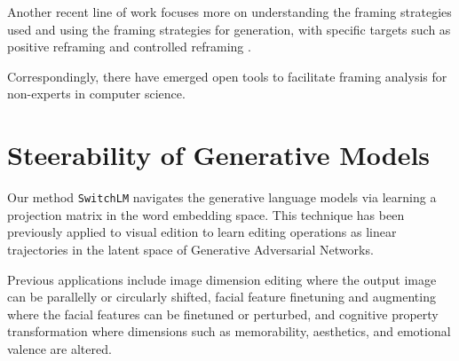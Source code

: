 Another recent line of work focuses more on understanding the framing strategies used \cite{field-etal-2018-framing,ziems-yang-2021-protect-serve} and using the framing strategies for generation, with specific targets such as positive reframing \cite{ziems-etal-2022-inducing} and controlled reframing \cite{chen-etal-2021-controlled-neural}. 

Correspondingly, there have emerged open tools \cite{bhatia-etal-2021-openframing} to facilitate framing analysis for non-experts in computer science.

\section{Steerability of Generative Models}
Our method \texttt{SwitchLM} navigates the generative language models via learning a  projection matrix in the word embedding space. This technique has been previously applied to visual edition \cite{jahanian2019steerability,denton2019facial,shen2019facial,goetschalckx2019visual} to learn editing operations as linear trajectories in the latent space of Generative Adversarial Networks. 

Previous applications include image dimension editing \cite{jahanian2019steerability} where the output image can be parallelly or circularly shifted, facial feature finetuning and augmenting \cite{denton2019facial,shen2019facial} where the facial features can be finetuned or perturbed, and cognitive property transformation \cite{goetschalckx2019visual} where dimensions such as memorability, aesthetics, and emotional valence are altered.